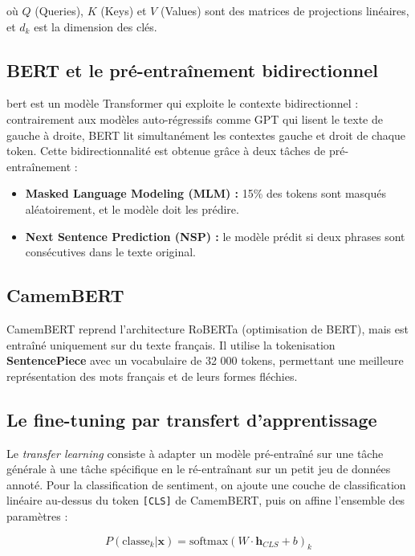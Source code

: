 où $Q$ (Queries), $K$ (Keys) et $V$ (Values) sont des matrices de
projections linéaires, et $d_k$ est la dimension des clés.

\subsection{BERT et le pré-entraînement bidirectionnel}

\acrfull{bert} \cite{devlin2019bert} est un modèle Transformer qui exploite
le contexte bidirectionnel : contrairement aux modèles auto-régressifs comme
GPT qui lisent le texte de gauche à droite, BERT lit simultanément les
contextes gauche et droit de chaque token. Cette bidirectionnalité est
obtenue grâce à deux tâches de pré-entraînement :

\begin{itemize}
  \item \textbf{Masked Language Modeling (MLM) :} 15\% des tokens sont
        masqués aléatoirement, et le modèle doit les prédire.
  \item \textbf{Next Sentence Prediction (NSP) :} le modèle prédit si
        deux phrases sont consécutives dans le texte original.
\end{itemize}

\subsection{CamemBERT}

CamemBERT reprend l'architecture RoBERTa \cite{liu2019roberta} (optimisation
de BERT), mais est entraîné uniquement sur du texte français. Il utilise la
tokenisation \textbf{SentencePiece} \cite{kudo2018sentencepiece} avec un
vocabulaire de 32 000 tokens, permettant une meilleure représentation
des mots français et de leurs formes fléchies.

\subsection{Le fine-tuning par transfert d'apprentissage}

Le \textit{transfer learning} consiste à adapter un modèle pré-entraîné
sur une tâche générale à une tâche spécifique en le ré-entraînant sur un
petit jeu de données annoté. Pour la classification de sentiment, on ajoute
une couche de classification linéaire au-dessus du token \texttt{[CLS]}
de CamemBERT, puis on affine l'ensemble des paramètres :

\begin{equation}
P(\text{classe}_k | \mathbf{x}) = \text{softmax}(W \cdot \mathbf{h}_{CLS} + b)_k
\label{eq:classification}
\end{equation}

